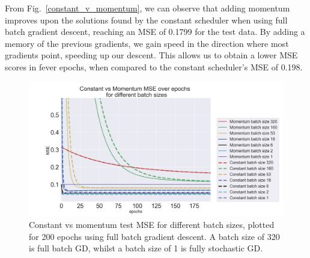\documentclass[onecolumn,10pt,cleanfoot]{asme2ej}
\begin{document}
From  Fig.~\ref{constant_v_momentum}, we can observe that adding momentum improves upon the solutions found by the constant scheduler when using full batch gradient descent, reaching an MSE of 0.1799 for the test data. By adding a memory of the previous gradients, we gain speed in the direction where most gradients point, speeding up our descent. This allows us to obtain a lower MSE scores in fever epochs, when compared to the constant scheduler's MSE of 0.198.


\begin{figure}[h]
\centerline{\includegraphics[width=5in]{figure/SGD_batch_momentum_constant.png}}
\caption{Constant vs momentum test MSE for different batch sizes, plotted for 200 epochs using full batch gradient descent. A batch size of 320 is full batch GD, whilst a batch size of 1 is fully stochastic GD.}
\label{batch_constant_v_momentum}
\end{figure}
\end{document}

